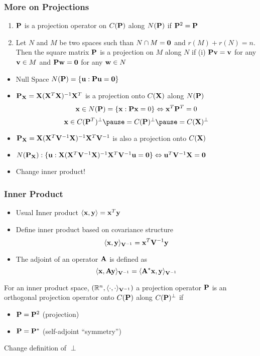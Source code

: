 \documentclass[]{beamer}
\begin{document}
\begin{frame}
  \frametitle{More on Projections}
  \begin{definition}
    \begin{enumerate}
    \item  $\P$ is a projection operator on $C(\P)$ along $N(\P)$ if $\P^2 =
 \P$ \pause
 \item Let $N$ and $M$ be two spaces such than $N \cap M = {\zero}$
   and $r(M) + r(N) = n$. Then the square matrix $\P$ is a projection
   on $M$ along $N$ if (i) $\P \v = \v$ for any $\v \in M$ and $\P \w
   = \zero$ for any $\w \in N$
    \end{enumerate} \pause
  \end{definition}


 \begin{itemize}
 \item  Null Space $N(\P) = \{\u:  \P \u = \zero \}$ \pause
  \item $\P_\X = \X (\X^T \X)^{-1} \X^T$ is a projection
  onto $C(\X)$ along  $N(\P)$  \pause
$$ \x \in N(\P) = \{ \x:  \P \x = 0 \} \Leftrightarrow \x^T \P^T = 0$$  \pause
$$\x \in C(\P^T)^\perp \pause = C(\P)^\perp \pause = C(\X)^\perp$$ \pause
\item   $\P_{\X} = \X (\X^T \V^{-1} \X)^{-1} \X^T \V^{-1}$ is also a projection
  onto $C(\X)$ \pause
\item $N(\P_\X): \{\u : \X(\X^T\V^{-1}\X)^{-1}\X^T \V^{-1} \u = \zero
  \} \Leftrightarrow \u^T \V^{-1} \X  = \zero$ \pause
\item Change inner product! 
 \end{itemize}
\end{frame}

\begin{frame}
  \frametitle{Inner Product}
  \begin{itemize}
  \item Usual Inner product $\langle \x, \y \rangle = \x^T\y$ \pause
 \item  Define inner product based on covariance structure
 $$\langle \x, \y \rangle_{\V^{-1}} = \x^T\V^{-1} \y$$ \pause
\item The adjoint of an operator $\A$ is defined as 
 $$\langle \x, \A\y \rangle_{\V^{-1}} = \langle \A^*\x, \y
 \rangle_{\V^{-1}}$$ \pause

  \end{itemize}
  \begin{definition}
 For an inner product space, $(\bbR^n, \langle \cdot, \cdot
 \rangle_{\V^{-1}})$ a projection operator $\P$ is an orthogonal
 projection operator onto $C(\P)$ along $C(\P)^\perp$ if \pause
 \begin{itemize}
 \item $\P = \P^2$  (projection) \pause
 \item $\P = \P^*$  (self-adjoint  ``symmetry'')  \pause
 \end{itemize}
  
  \end{definition}
Change definition of $\perp$ 
\end{frame}
\end{document}

